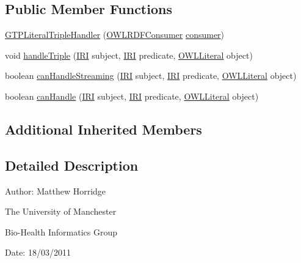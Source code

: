 \subsection*{Public Member Functions}
\begin{DoxyCompactItemize}
\item 
\hyperlink{classorg_1_1coode_1_1owlapi_1_1rdfxml_1_1parser_1_1_g_t_p_literal_triple_handler_a6426d16040017d1d443ea3e6f91cbd5b}{G\-T\-P\-Literal\-Triple\-Handler} (\hyperlink{classorg_1_1coode_1_1owlapi_1_1rdfxml_1_1parser_1_1_o_w_l_r_d_f_consumer}{O\-W\-L\-R\-D\-F\-Consumer} \hyperlink{classorg_1_1coode_1_1owlapi_1_1rdfxml_1_1parser_1_1_abstract_triple_handler_a4ccf4d898ff01eb1cadfa04b23d54e9c}{consumer})
\item 
void \hyperlink{classorg_1_1coode_1_1owlapi_1_1rdfxml_1_1parser_1_1_g_t_p_literal_triple_handler_a85b4279413a0909d2e83823c1e5aaa23}{handle\-Triple} (\hyperlink{classorg_1_1semanticweb_1_1owlapi_1_1model_1_1_i_r_i}{I\-R\-I} subject, \hyperlink{classorg_1_1semanticweb_1_1owlapi_1_1model_1_1_i_r_i}{I\-R\-I} predicate, \hyperlink{interfaceorg_1_1semanticweb_1_1owlapi_1_1model_1_1_o_w_l_literal}{O\-W\-L\-Literal} object)
\item 
boolean \hyperlink{classorg_1_1coode_1_1owlapi_1_1rdfxml_1_1parser_1_1_g_t_p_literal_triple_handler_a6befae96cc9ac856353b9cfc939ec4a2}{can\-Handle\-Streaming} (\hyperlink{classorg_1_1semanticweb_1_1owlapi_1_1model_1_1_i_r_i}{I\-R\-I} subject, \hyperlink{classorg_1_1semanticweb_1_1owlapi_1_1model_1_1_i_r_i}{I\-R\-I} predicate, \hyperlink{interfaceorg_1_1semanticweb_1_1owlapi_1_1model_1_1_o_w_l_literal}{O\-W\-L\-Literal} object)
\item 
boolean \hyperlink{classorg_1_1coode_1_1owlapi_1_1rdfxml_1_1parser_1_1_g_t_p_literal_triple_handler_af2c8a594953f7f22abc39e762b922d2a}{can\-Handle} (\hyperlink{classorg_1_1semanticweb_1_1owlapi_1_1model_1_1_i_r_i}{I\-R\-I} subject, \hyperlink{classorg_1_1semanticweb_1_1owlapi_1_1model_1_1_i_r_i}{I\-R\-I} predicate, \hyperlink{interfaceorg_1_1semanticweb_1_1owlapi_1_1model_1_1_o_w_l_literal}{O\-W\-L\-Literal} object)
\end{DoxyCompactItemize}
\subsection*{Additional Inherited Members}


\subsection{Detailed Description}
Author\-: Matthew Horridge\par
 The University of Manchester\par
 Bio-\/\-Health Informatics Group\par
 Date\-: 18/03/2011 

